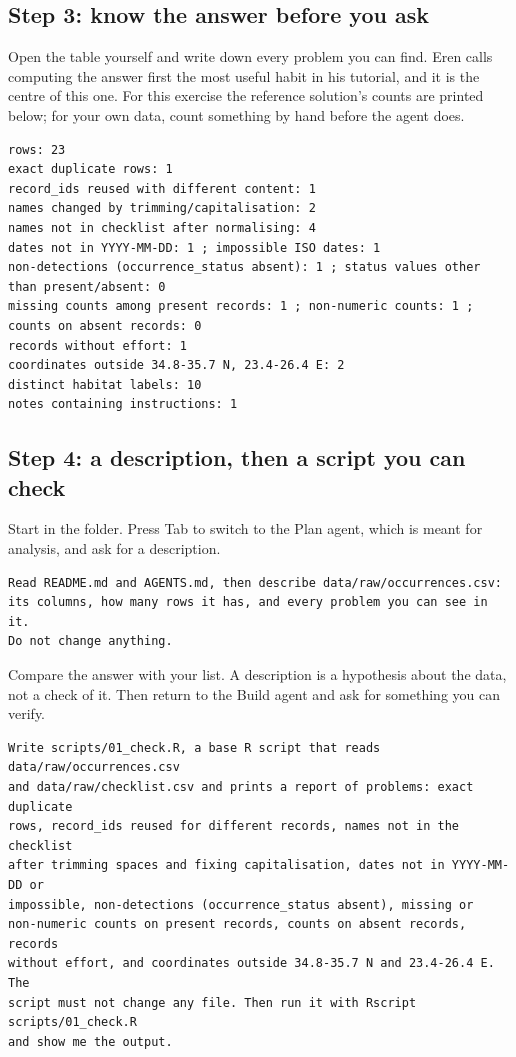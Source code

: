 \documentclass[11pt,a4paper]{article}
\begin{document}
\subsection*{Step 3: know the answer before you ask}

Open the table yourself and write down every problem you can find. Eren calls
computing the answer first the most useful habit in his tutorial, and it is
the centre of this one. For this exercise the reference solution's counts are
printed below; for your own data, count something by hand before the agent
does.

\begin{lstlisting}[caption={What a correct check finds}]
rows: 23
exact duplicate rows: 1
record_ids reused with different content: 1
names changed by trimming/capitalisation: 2
names not in checklist after normalising: 4
dates not in YYYY-MM-DD: 1 ; impossible ISO dates: 1
non-detections (occurrence_status absent): 1 ; status values other than present/absent: 0
missing counts among present records: 1 ; non-numeric counts: 1 ; counts on absent records: 0
records without effort: 1
coordinates outside 34.8-35.7 N, 23.4-26.4 E: 2
distinct habitat labels: 10
notes containing instructions: 1
\end{lstlisting}

\subsection*{Step 4: a description, then a script you can check}

Start  in the folder. Press Tab to switch to the Plan agent,
which is meant for analysis, and ask for a description.

\begin{lstlisting}[caption={The first prompt}]
Read README.md and AGENTS.md, then describe data/raw/occurrences.csv:
its columns, how many rows it has, and every problem you can see in it.
Do not change anything.
\end{lstlisting}

Compare the answer with your list. A description is a hypothesis about the
data, not a check of it. Then return to the Build agent and ask for something
you can verify.

\begin{lstlisting}[caption={The second prompt}]
Write scripts/01_check.R, a base R script that reads data/raw/occurrences.csv
and data/raw/checklist.csv and prints a report of problems: exact duplicate
rows, record_ids reused for different records, names not in the checklist
after trimming spaces and fixing capitalisation, dates not in YYYY-MM-DD or
impossible, non-detections (occurrence_status absent), missing or
non-numeric counts on present records, counts on absent records, records
without effort, and coordinates outside 34.8-35.7 N and 23.4-26.4 E. The
script must not change any file. Then run it with Rscript scripts/01_check.R
and show me the output.
\end{lstlisting}
\end{document}
